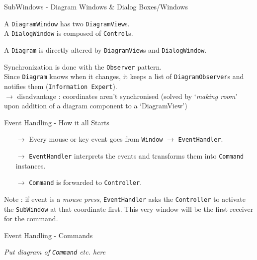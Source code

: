 \documentclass[10pt]{beamer}
\begin{document}
\begin{frame}[fragile]{SubWindows - Diagram Windows \& Dialog Boxes/Windows}
	\begin{center}
	A \texttt{DiagramWindow} has two \texttt{DiagramView}s.
	\\A \texttt{DialogWindow} is composed of \texttt{Control}s.
	
	\vspace{0.5cm}
	A \texttt{Diagram} is directly altered by \texttt{DiagramView}s and \texttt{DialogWindow}.
	
	\vspace{0.5cm}
	Synchronization is done with the \texttt{Observer} pattern. 
	\\ Since \texttt{Diagram} knows when it changes, it keeps a list of \texttt{DiagramObserver}s and notifies them (\texttt{Information Expert}).
	\\$\rightarrow$ disadvantage : coordinates aren't synchronised (solved by `\textit{making room}' upon addition of a diagram component to a `DiagramView')
	\end{center}
\end{frame}

\begin{frame}[fragile]{Event Handling - How it all Starts}
	\begin{center}
	\begin{itemize}
	\item[$\rightarrow$] Every mouse or key event goes from \texttt{Window} $\rightarrow$ \texttt{EventHandler}.
	\item[$\rightarrow$] \texttt{EventHandler} interprets the events and transforms them into \texttt{Command} instances.
	\item[$\rightarrow$] \texttt{Command} is forwarded to \texttt{Controller}.
	\end{itemize}
	Note : if event is a \textit{mouse press}, \texttt{EventHandler} asks the \texttt{Controller} to activate the \texttt{SubWindow} at that coordinate first. This very window will be the first receiver for the command. 
	\end{center}
\end{frame}

\begin{frame}[fragile]{Event Handling - Commands}
	\begin{center}
	\textit{Put diagram of \texttt{Command} etc. here}
	\end{center}
\end{frame}
\end{document}
